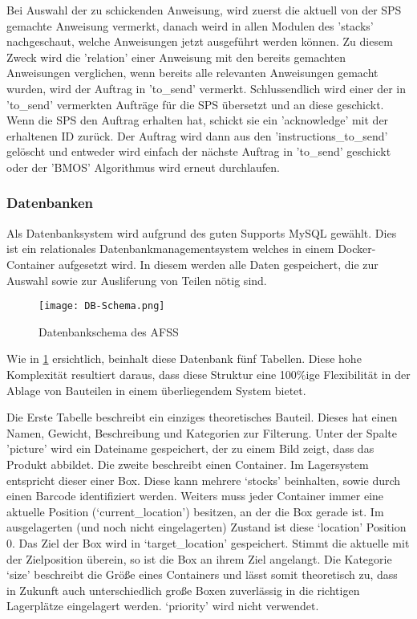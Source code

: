 Bei Auswahl der zu schickenden Anweisung, wird zuerst die aktuell von der SPS gemachte Anweisung vermerkt, danach weird in allen Modulen des 'stacks' nachgeschaut, welche Anweisungen jetzt ausgeführt werden können. Zu diesem Zweck wird die 'relation' einer Anweisung mit den bereits gemachten Anweisungen verglichen, wenn bereits alle relevanten Anweisungen gemacht wurden, wird der Auftrag in 'to\_send' vermerkt. Schlussendlich wird einer der in 'to\_send' vermerkten Aufträge für die SPS übersetzt und an diese geschickt. 
Wenn die SPS den Auftrag erhalten hat, schickt sie ein 'acknowledge' mit der erhaltenen ID zurück. Der Auftrag wird dann aus den 'instructions\_to\_send' gelöscht und entweder wird einfach der nächste Auftrag in 'to\_send' geschickt oder der 'BMOS' Algorithmus wird erneut durchlaufen.


\subsubsection{Datenbanken}

Als Datenbanksystem wird aufgrund des guten Supports MySQL gewählt. Dies ist ein relationales Datenbankmanagementsystem welches in einem Docker-Container aufgesetzt wird. In diesem werden alle Daten gespeichert, die zur Auswahl sowie zur Ausliferung von Teilen nötig sind.

\begin{figure}[h]
    \texttt{[image: DB-Schema.png]}
    \centering
    \caption{Datenbankschema des AFSS}
    \label{DB-Scema}
\end{figure}

Wie in \ref{DB-Scema} ersichtlich, beinhalt diese Datenbank fünf Tabellen. Diese hohe Komplexität resultiert daraus, dass diese Struktur eine 100\%ige Flexibilität in der Ablage von Bauteilen in einem überliegendem System bietet.

Die Erste Tabelle beschreibt ein einziges theoretisches Bauteil. Dieses hat einen Namen, Gewicht, Beschreibung und Kategorien zur Filterung. Unter der Spalte 'picture' wird ein Dateiname gespeichert, der zu einem Bild zeigt, dass das Produkt abbildet.
Die zweite beschreibt einen Container. Im Lagersystem entspricht dieser einer Box. Diese kann mehrere `stocks' beinhalten, sowie durch einen Barcode identifiziert werden. Weiters muss jeder Container immer eine aktuelle Position (`current\_location') besitzen, an der die Box gerade ist. Im ausgelagerten (und noch nicht eingelagerten) Zustand ist diese `location' Position 0. Das Ziel der Box wird in `target\_location' gespeichert. Stimmt die aktuelle mit der Zielposition überein, so ist die Box an ihrem Ziel angelangt. Die Kategorie `size' beschreibt die Größe eines Containers und lässt somit theoretisch zu, dass in Zukunft auch unterschiedlich große Boxen zuverlässig in die richtigen Lagerplätze eingelagert werden. `priority' wird nicht verwendet.

